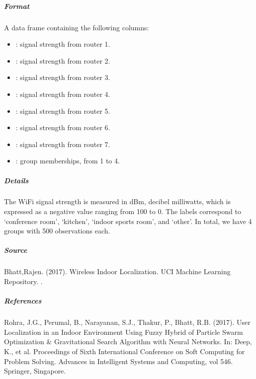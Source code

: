 \documentclass[letterpaper,10pt,english,openany,oneside]{sphinxmanual}
\begin{document}
{{{{\subparagraph{Format}
\label{\detokenize{user_guide/datasets:format}}
\sphinxAtStartPar
A data frame containing the following columns:
\begin{itemize}
\item {} 
\sphinxAtStartPar
{}: signal strength from router 1.

\item {} 
\sphinxAtStartPar
{}: signal strength from router 2.

\item {} 
\sphinxAtStartPar
{}: signal strength from router 3.

\item {} 
\sphinxAtStartPar
{}: signal strength from router 4.

\item {} 
\sphinxAtStartPar
{}: signal strength from router 5.

\item {} 
\sphinxAtStartPar
{}: signal strength from router 6.

\item {} 
\sphinxAtStartPar
{}: signal strength from router 7.

\item {} 
\sphinxAtStartPar
{}: group memberships, from 1 to 4.

\end{itemize}


\subparagraph{Details}
\label{\detokenize{user_guide/datasets:details}}
\sphinxAtStartPar
The Wi\sphinxhyphen{}Fi signal strength is measured in dBm, decibel milliwatts, which is expressed
as a negative value ranging from \sphinxhyphen{}100 to 0. The labels correspond to ‘conference room’,
‘kitchen’, ‘indoor sports room’, and ‘other’. In total, we have 4 groups with 500 observations each.


\subparagraph{Source}
\label{\detokenize{user_guide/datasets:source}}
\sphinxAtStartPar
Bhatt,Rajen. (2017). Wireless Indoor Localization. UCI Machine Learning Repository. .


\subparagraph{References}
\label{\detokenize{user_guide/datasets:references}}
\sphinxAtStartPar
Rohra, J.G., Perumal, B., Narayanan, S.J., Thakur, P., Bhatt, R.B. (2017). User Localization in an Indoor Environment Using Fuzzy Hybrid of Particle Swarm Optimization \& Gravitational Search Algorithm with Neural Networks. In: Deep, K., et al. Proceedings of Sixth International Conference on Soft Computing for Problem Solving. Advances in Intelligent Systems and Computing, vol 546. Springer, Singapore. 


}}}}
\end{document}
